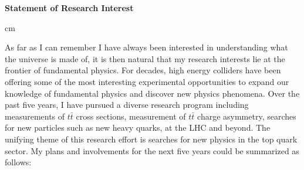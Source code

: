 \documentclass[12pt]{article}
\begin{document}
\pagestyle{fancy}
\fancyhf{}


\begin{center}
{\bf \Large Statement of Research Interest} \\
\end{center}


 cm

\noindent
As far as I can remember I have always been interested in understanding what the universe is made of, 
it is then natural that my research interests lie at the frontier of fundamental physics. 
For decades, high energy colliders have been offering some of the most interesting experimental 
opportunities to expand our knowledge of fundamental physics and discover new physics phenomena. 
Over the past five years, I have pursued a diverse research program including measurements of $t\bar{t}$ cross sections, measurement of $t\bar{t}$ charge asymmetry, 
searches for new particles such as new heavy quarks, at the LHC and beyond. The unifying theme of this research effort is searches for new physics in the top quark sector. 
My plans and involvements for the next five years could be summarized as follows:\\
\end{document}
